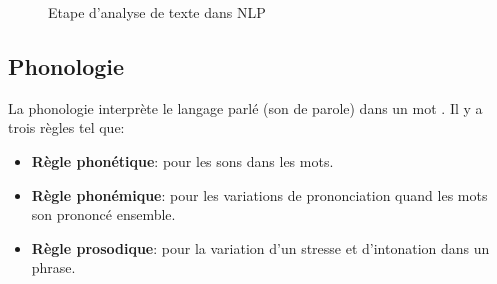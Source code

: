 \begin{figure}[htbp]
    \begin{center}
    \end{center}
    \caption{Etape d'analyse de texte dans NLP \citep{handbook-nlp}}
    \label{fig:nlp-stage}
\end{figure}

\subsection{Phonologie}
La phonologie interprète le langage parlé (son de parole) dans un mot \citep{natural-language-processing}. Il y a trois règles tel que:
\begin{itemize}
    \item \textbf{Règle phonétique}: pour les sons dans les mots.
    \item \textbf{Règle phonémique}: pour les variations de prononciation quand les mots son prononcé ensemble.
    \item \textbf{Règle prosodique}: pour la variation d'un stresse et d'intonation dans un phrase.
\end{itemize}


